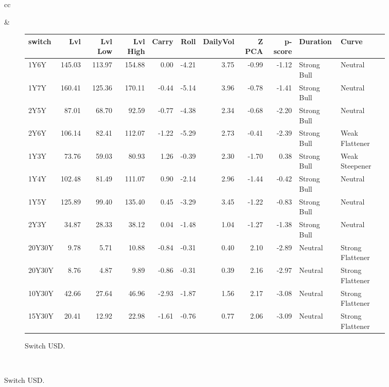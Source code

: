 \documentclass[a4paper,twoside]{report}
\begin{document}
\begin{figure}[htbp]
\begin{tabular}[c]{cc}
 

\begin{subfigure}[c]{0.5\textwidth}
 
 \null\hfill
 \end{subfigure}&
 
\begin{subfigure}[c]{0.5\textwidth}
\caption{Switch USD.}
 \label{fig:Switch USD}
\begin{adjustbox}{max width=\textwidth}
 \begin{tabular}{lrrrrrrrrll}
\hline
 switch &     Lvl &  Lvl Low &  Lvl High &  Carry &  Roll &  DailyVol &  Z PCA &  p-score &     Duration &             Curve \\
\hline
   1Y6Y &  145.03 &   113.97 &    154.88 &   0.00 & -4.21 &      3.75 &  -0.99 &    -1.12 &  Strong Bull &           Neutral \\
   1Y7Y &  160.41 &   125.36 &    170.11 &  -0.44 & -5.14 &      3.96 &  -0.78 &    -1.41 &  Strong Bull &           Neutral \\
   2Y5Y &   87.01 &    68.70 &     92.59 &  -0.77 & -4.38 &      2.34 &  -0.68 &    -2.20 &  Strong Bull &           Neutral \\
   2Y6Y &  106.14 &    82.41 &    112.07 &  -1.22 & -5.29 &      2.73 &  -0.41 &    -2.39 &  Strong Bull &    Weak Flattener \\
   1Y3Y &   73.76 &    59.03 &     80.93 &   1.26 & -0.39 &      2.30 &  -1.70 &     0.38 &  Strong Bull &    Weak Steepener \\
   1Y4Y &  102.48 &    81.49 &    111.07 &   0.90 & -2.14 &      2.96 &  -1.44 &    -0.42 &  Strong Bull &           Neutral \\
   1Y5Y &  125.89 &    99.40 &    135.40 &   0.45 & -3.29 &      3.45 &  -1.22 &    -0.83 &  Strong Bull &           Neutral \\
   2Y3Y &   34.87 &    28.33 &     38.12 &   0.04 & -1.48 &      1.04 &  -1.27 &    -1.38 &  Strong Bull &           Neutral \\
 20Y30Y &    9.78 &     5.71 &     10.88 &  -0.84 & -0.31 &      0.40 &   2.10 &    -2.89 &      Neutral &  Strong Flattener \\
 20Y30Y &    8.76 &     4.87 &      9.89 &  -0.86 & -0.31 &      0.39 &   2.16 &    -2.97 &      Neutral &  Strong Flattener \\
 10Y30Y &   42.66 &    27.64 &     46.96 &  -2.93 & -1.87 &      1.56 &   2.17 &    -3.08 &      Neutral &  Strong Flattener \\
 15Y30Y &   20.41 &    12.92 &     22.98 &  -1.61 & -0.76 &      0.77 &   2.06 &    -3.09 &      Neutral &  Strong Flattener \\
\hline
\end{tabular}
\end{adjustbox}
 \end{subfigure}\\
 

\end{tabular}
\end{figure}
\end{document}
